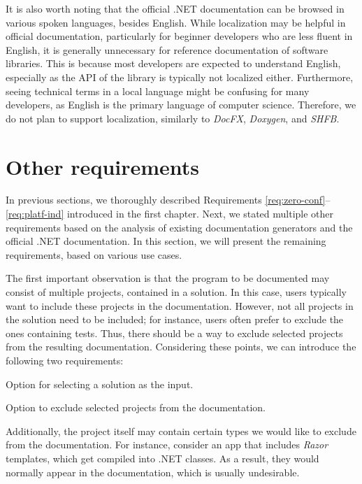 It is also worth noting that the official .NET documentation can be browsed in various spoken languages, besides English.
While localization may be helpful in official documentation, particularly for beginner developers who are less fluent in English, it is generally unnecessary for reference documentation of software libraries.
This is because most developers are expected to understand English, especially as the API of the library is typically not localized either.
Furthermore, seeing technical terms in a local language might be confusing for many developers, as English is the primary language of computer science.
Therefore, we do not plan to support localization, similarly to \textit{DocFX}, \textit{Doxygen}, and \textit{SHFB}.

\section*{Other requirements}
In previous sections, we thoroughly described Requirements \ref{req:zero-conf}--\ref{req:platf-ind} introduced in the first chapter. 
Next, we stated multiple other requirements based on the analysis of existing documentation generators and the official .NET documentation.
In this section, we will present the remaining requirements, based on various use cases.

The first important observation is that the program to be documented may consist of multiple projects, contained in a solution. 
In this case, users typically want to include these projects in the documentation.
However, not all projects in the solution need to be included; for instance, users often prefer to exclude the ones containing tests. 
Thus, there should be a way to exclude selected projects from the resulting documentation.
Considering these points, we can introduce the following two requirements:

\begin{requirement}
    Option for selecting a solution as the input.
    \label{req:solution-as-input}
\end{requirement}

\begin{requirement}
    Option to exclude selected projects from the documentation.
    \label{req:exclude-assemblies}
\end{requirement}

Additionally, the project itself may contain certain types we would like to exclude from the documentation.
For instance, consider an app that includes \textit{Razor} templates, which get compiled into .NET classes.
As a result, they would normally appear in the documentation, which is usually undesirable.

